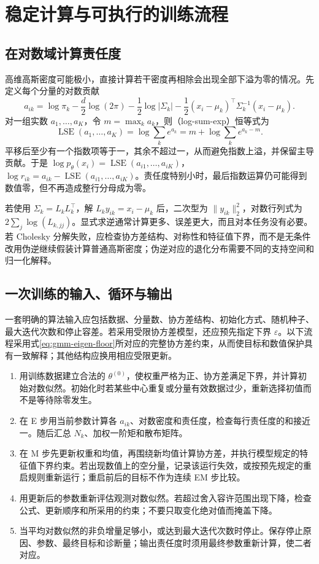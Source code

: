 \documentclass[UTF8]{ctexart}
\begin{document}
\section{稳定计算与可执行的训练流程}
\label{sec:gmm-implementation}

\subsection{在对数域计算责任度}
高维高斯密度可能极小，直接计算若干密度再相除会出现全部下溢为零的情况。先定义每个分量的对数贡献
\[
a_{ik}=\log\pi_k-\frac d2\log(2\pi)-\frac12\log|\Sigma_k|
-\frac12(x_i-\mu_k)^\top\Sigma_k^{-1}(x_i-\mu_k).
\]
对一组实数 $a_1,\ldots,a_K$，令 $m=\max_ka_k$，则（log-sum-exp）恒等式为
\begin{equation}
\operatorname{LSE}(a_1,\ldots,a_K)
=\log\sum_ke^{a_k}=m+\log\sum_ke^{a_k-m}.
\label{eq:gmm-lse}
\end{equation}
平移后至少有一个指数项等于一，其余不超过一，从而避免指数上溢，并保留主导贡献。于是 $\log p_\theta(x_i)=\operatorname{LSE}(a_{i1},\ldots,a_{iK})$，$\log r_{ik}=a_{ik}-\operatorname{LSE}(a_{i1},\ldots,a_{iK})$。责任度特别小时，最后指数运算仍可能得到数值零，但不再造成整行分母成为零。

若使用 $\Sigma_k=L_kL_k^\top$，解 $L_ky_{ik}=x_i-\mu_k$ 后，二次型为 $\|y_{ik}\|_2^2$，对数行列式为 $2\sum_j\log(L_{k,jj})$。显式求逆通常计算更多、误差更大，而且对本任务没有必要。若 Cholesky 分解失败，应检查协方差结构、对称性和特征值下界，而不是无条件改用伪逆继续假装计算普通高斯密度；伪逆对应的退化分布需要不同的支持空间和归一化解释。

\subsection{一次训练的输入、循环与输出}
一套明确的算法输入应包括数据、分量数、协方差结构、初始化方式、随机种子、最大迭代次数和停止容差。若采用受限协方差模型，还应预先指定下界 $\varepsilon$。以下流程采用式\eqref{eq:gmm-eigen-floor}所对应的完整协方差约束，从而使目标和数值保护具有一致解释；其他结构应换用相应受限更新。
\begin{enumerate}
\item 用训练数据建立合法的 $\theta^{(0)}$，使权重严格为正、协方差满足下界，并计算初始对数似然。初始化时若某些中心重复或分量有效数据过少，重新选择初值而不是等待除零发生。
\item 在 E 步用当前参数计算各 $a_{ik}$、对数密度和责任度，检查每行责任度的和接近一。随后汇总 $N_k$、加权一阶矩和散布矩阵。
\item 在 M 步先更新权重和均值，再围绕新均值计算协方差，并执行模型规定的特征值下界约束。若出现数值上的空分量，记录该运行失效，或按预先规定的重启规则重新运行；重启前后的目标不作为连续 EM 步比较。
\item 用更新后的参数重新评估观测对数似然。若超过舍入容许范围出现下降，检查公式、更新顺序和所采用的约束；不要只取变化绝对值而掩盖下降。
\item 当平均对数似然的非负增量足够小，或达到最大迭代次数时停止。保存停止原因、参数、最终目标和诊断量；输出责任度时须用最终参数重新计算，使二者对应。
\end{enumerate}
\end{document}
